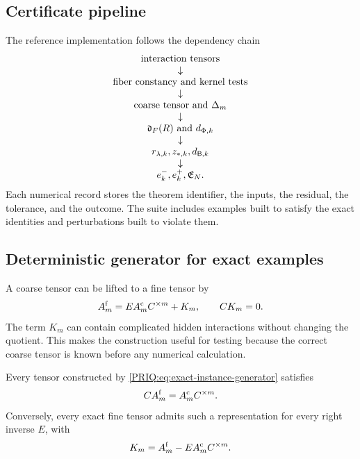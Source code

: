 \subsection{Certificate pipeline}
The reference implementation follows the dependency chain
\[
\begin{array}{c}
\text{interaction tensors}\\
\downarrow\\
\text{fiber constancy and kernel tests}\\
\downarrow\\
\text{coarse tensor and }\Delta_m\\
\downarrow\\
\mathfrak d_F(R)\text{ and }d_{\Phi,k}\\
\downarrow\\
 r_{\lambda,k},z_{*,k},d_{\mathsf B,k}\\
\downarrow\\
 e_k^-,e_k^+,\mathfrak E_N.
\end{array}
\]
Each numerical record stores the theorem identifier, the inputs, the residual, the tolerance, and the outcome.  The suite includes examples built to satisfy the exact identities and perturbations built to violate them.

\subsection{Deterministic generator for exact examples}
A coarse tensor can be lifted to a fine tensor by
\begin{equation}\label{PRIQ:eq:exact-instance-generator}
  A_m^{\mathrm f}
  =
  EA_m^{\mathrm c}C^{\times m}+K_m,
  \qquad
  CK_m=0.
\end{equation}
The term $K_m$ can contain complicated hidden interactions without changing the quotient.  This makes the construction useful for testing because the correct coarse tensor is known before any numerical calculation.

\begin{PRIQproposition}\label{PRIQ:prop:exact-instance-generator}
Every tensor constructed by \eqref{PRIQ:eq:exact-instance-generator} satisfies
\[
  CA_m^{\mathrm f}=A_m^{\mathrm c}C^{\times m}.
\]
Conversely, every exact fine tensor admits such a representation for every right inverse $E$, with
\[
  K_m=A_m^{\mathrm f}-EA_m^{\mathrm c}C^{\times m}.
\]
\end{PRIQproposition}


